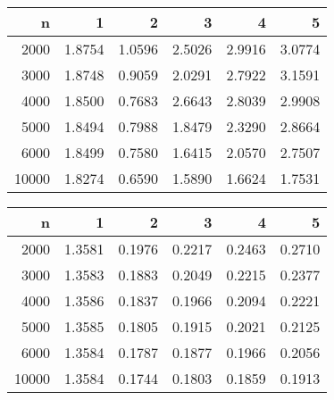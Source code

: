 \begin{table}[ht]
\centering
\begin{tabular}{rrrrrr}
  \hline
n & 1 & 2 & 3 & 4 & 5 \\ 
  \hline
2000 & 1.8754 & 1.0596 & 2.5026 & 2.9916 & 3.0774 \\ 
  3000 & 1.8748 & 0.9059 & 2.0291 & 2.7922 & 3.1591 \\ 
  4000 & 1.8500 & 0.7683 & 2.6643 & 2.8039 & 2.9908 \\ 
  5000 & 1.8494 & 0.7988 & 1.8479 & 2.3290 & 2.8664 \\ 
  6000 & 1.8499 & 0.7580 & 1.6415 & 2.0570 & 2.7507 \\ 
  10000 & 1.8274 & 0.6590 & 1.5890 & 1.6624 & 1.7531 \\ 
   \hline
\end{tabular}
\end{table}
\begin{table}[ht]
\centering
\begin{tabular}{rrrrrr}
  \hline
n & 1 & 2 & 3 & 4 & 5 \\ 
  \hline
2000 & 1.3581 & 0.1976 & 0.2217 & 0.2463 & 0.2710 \\ 
  3000 & 1.3583 & 0.1883 & 0.2049 & 0.2215 & 0.2377 \\ 
  4000 & 1.3586 & 0.1837 & 0.1966 & 0.2094 & 0.2221 \\ 
  5000 & 1.3585 & 0.1805 & 0.1915 & 0.2021 & 0.2125 \\ 
  6000 & 1.3584 & 0.1787 & 0.1877 & 0.1966 & 0.2056 \\ 
  10000 & 1.3584 & 0.1744 & 0.1803 & 0.1859 & 0.1913 \\ 
   \hline
\end{tabular}
\end{table}
